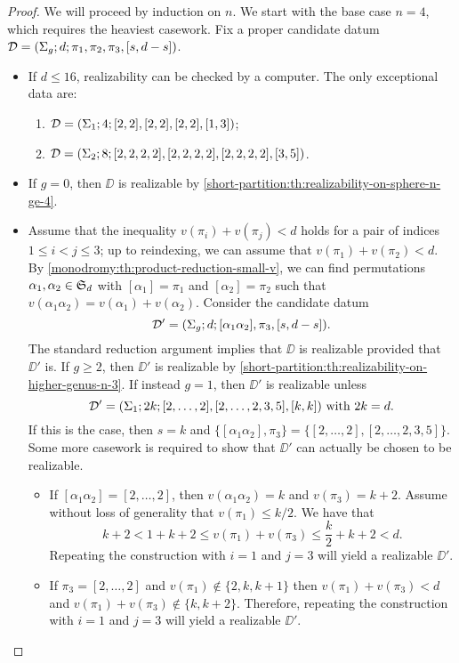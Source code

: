 \begin{proof}
We will proceed by induction on $n$. We start with the base case $n=4$, which requires the heaviest casework. Fix a proper candidate datum $\mathcal{D}=(\Sigma_{g};d;\pi_1,\pi_2,\pi_3,[s,d-s])$.
\begin{itemize}
\item If $d\le 16$, realizability can be checked by a computer. The only exceptional data are:
\begin{enumerate}[(1)]
\item $\mathcal{D}=(\Sigma_{1};4;[2, 2],[2, 2],[2, 2],[1, 3])$;
\item $\mathcal{D}=(\Sigma_{2};8;[2, 2, 2, 2],[2, 2, 2, 2],[2, 2, 2, 2],[3, 5])$.
\end{enumerate}
\item If $g=0$, then $\DD$ is realizable by \cref{short-partition:th:realizability-on-sphere-n-ge-4}.
\item Assume that the inequality $v(\pi_i)+v(\pi_j)<d$ holds for a pair of indices $1\le i<j\le 3$; up to reindexing, we can assume that $v(\pi_1)+v(\pi_2)<d$. By \cref{monodromy:th:product-reduction-small-v}, we can find permutations $\alpha_1,\alpha_2\in\symgroup[d]$ with $[\alpha_1]=\pi_1$ and $[\alpha_2]=\pi_2$ such that $v(\alpha_1\alpha_2)=v(\alpha_1)+v(\alpha_2)$. Consider the candidate datum
\[
\mathcal{D}'=(\Sigma_{g};d;[\alpha_1\alpha_2],\pi_3,[s,d-s]).
\]
The standard reduction argument implies that $\DD$ is realizable provided that $\DD'$ is. If $g\ge 2$, then $\DD'$ is realizable by \cref{short-partition:th:realizability-on-higher-genus-n-3}. If instead $g=1$, then $\DD'$ is realizable unless
\[
\text{$\mathcal{D}'=(\Sigma_{1};2k;[2,\ldots,2],[2,\ldots,2,3,5],[k,k])$ with $2k=d$.}
\]
If this is the case, then $s=k$ and $\{[\alpha_1\alpha_2],\pi_3\}=\{[2,\ldots,2],[2,\ldots,2,3,5]\}$. Some more casework is required to show that $\DD'$ can actually be chosen to be realizable.
\begin{itemize}
\item If $[\alpha_1\alpha_2]=[2,\ldots,2]$, then $v(\alpha_1\alpha_2)=k$ and $v(\pi_3)=k+2$. Assume without loss of generality that $v(\pi_1)\le k/2$. We have that
\[
k+2<1+k+2\le v(\pi_1)+v(\pi_3)\le \frac{k}{2}+k+2<d.
\]
Repeating the construction with $i=1$ and $j=3$ will yield a realizable $\DD'$.
\item If $\pi_3=[2,\ldots,2]$ and $v(\pi_1)\not\in\{2,k,k+1\}$ then $v(\pi_1)+v(\pi_3)<d$ and $v(\pi_1)+v(\pi_3)\not\in\{k,k+2\}$. Therefore, repeating the construction with $i=1$ and $j=3$ will yield a realizable $\DD'$.

\end{itemize}
\end{itemize}
\end{proof}
